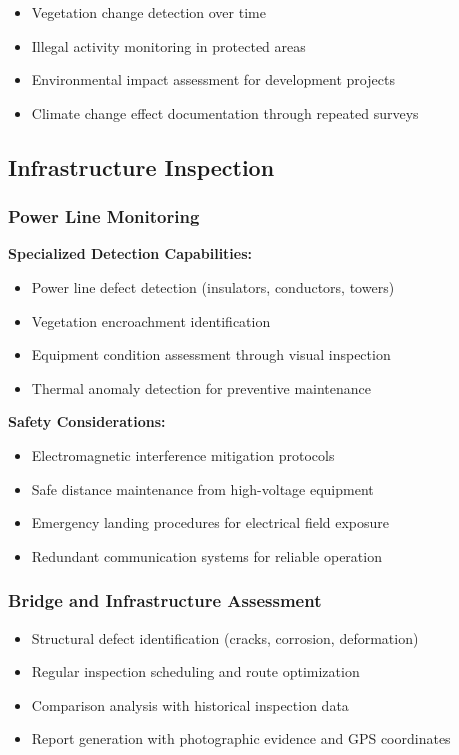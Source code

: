 \documentclass[11pt,a4paper]{article}
\begin{document}
\begin{itemize}
    \item Vegetation change detection over time
    \item Illegal activity monitoring in protected areas
    \item Environmental impact assessment for development projects
    \item Climate change effect documentation through repeated surveys
\end{itemize}

\subsection{Infrastructure Inspection}

\subsubsection{Power Line Monitoring}

\textbf{Specialized Detection Capabilities:}
\begin{itemize}
    \item Power line defect detection (insulators, conductors, towers)
    \item Vegetation encroachment identification
    \item Equipment condition assessment through visual inspection
    \item Thermal anomaly detection for preventive maintenance
\end{itemize}

\textbf{Safety Considerations:}
\begin{itemize}
    \item Electromagnetic interference mitigation protocols
    \item Safe distance maintenance from high-voltage equipment
    \item Emergency landing procedures for electrical field exposure
    \item Redundant communication systems for reliable operation
\end{itemize}

\subsubsection{Bridge and Infrastructure Assessment}

\begin{itemize}
    \item Structural defect identification (cracks, corrosion, deformation)
    \item Regular inspection scheduling and route optimization
    \item Comparison analysis with historical inspection data
    \item Report generation with photographic evidence and GPS coordinates
\end{itemize}
\end{document}
